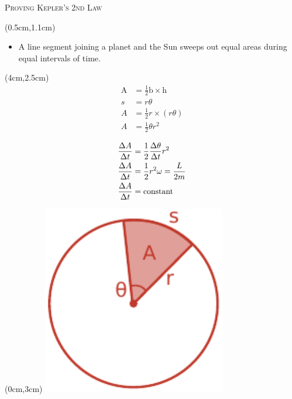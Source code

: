 \documentclass[9pt]{beamer}
\begin{document}
    \begin{frame}{\textsc{Proving Kepler's 2nd Law}}
        \centering
        \begin{textblock*}{10.5cm}(0.5cm,1.1cm)
            \begin{itemize}
                \item A line segment joining a planet and the Sun sweeps out equal areas during equal intervals of time.
            \end{itemize}
        \end{textblock*}

        \begin{textblock*}{10.5cm}(4cm,2.5cm)
            \centering
            \begin{align*}
                \text{A} &= \frac{1}{2}\text{b}\times\text{h} \\        
                s &= r\theta \\
                A&=\frac{1}{2}r\times\left(r\theta\right) \\          
                A&=\frac12 \theta r^2 \\
            \end{align*}
            \begin{align*}
                \frac{\Delta A}{\Delta t} &= \frac{1}{2}\frac{\Delta \theta}{\Delta t}r^2 \\
                \frac{\Delta A}{\Delta t} &= \frac{1}{2}r^2 \omega =\frac{L}{2m}  \\          
                \frac{\Delta A}{\Delta t} &= \rm{constant}
            \end{align*} 
        \end{textblock*}
        
        \begin{textblock*}{8cm}(0cm,3cm)
            \centering
            \includegraphics[width=0.6\textwidth]{assets/areas_proof.pdf}
        \end{textblock*}
    \end{frame}
    
    \begin{frame}{\textsc{}}

    \end{frame}
\end{document}
